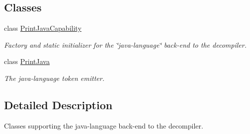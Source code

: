 \subsection*{Classes}
\begin{DoxyCompactItemize}
\item 
class \mbox{\hyperlink{class_print_java_capability}{Print\+Java\+Capability}}
\begin{DoxyCompactList}\small\item\em Factory and static initializer for the \char`\"{}java-\/language\char`\"{} back-\/end to the decompiler. \end{DoxyCompactList}\item 
class \mbox{\hyperlink{class_print_java}{Print\+Java}}
\begin{DoxyCompactList}\small\item\em The java-\/language token emitter. \end{DoxyCompactList}\end{DoxyCompactItemize}


\subsection{Detailed Description}
Classes supporting the java-\/language back-\/end to the decompiler. 

